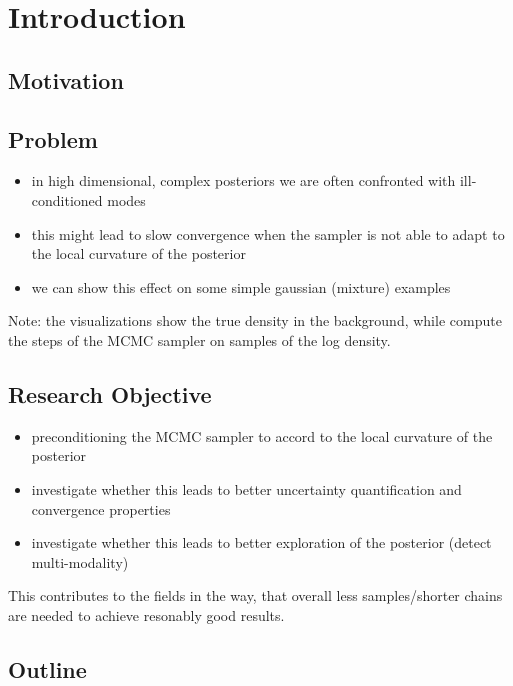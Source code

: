 \section{Introduction}\label{chap:introduction}

\subsection{Motivation}

\subsection{Problem}

\begin{itemize}
    \item in high dimensional, complex posteriors we are often confronted with
          ill-conditioned modes
    \item this might lead to slow convergence when the sampler is not able to adapt to
          the local curvature of the posterior
    \item we can show this effect on some simple gaussian (mixture) examples
\end{itemize}

Note: the visualizations show the true density in the background, while compute
the steps of the MCMC sampler on samples of the log density.

\subsection{Research Objective}

\begin{itemize}
    \item preconditioning the MCMC sampler to accord to the local curvature of the
          posterior
    \item investigate whether this leads to better uncertainty quantification and
          convergence properties
    \item investigate whether this leads to better exploration of the posterior (detect
          multi-modality)
\end{itemize}

This contributes to the fields in the way, that overall less samples/shorter
chains are needed to achieve resonably good results.

\subsection{Outline}


\newpage
